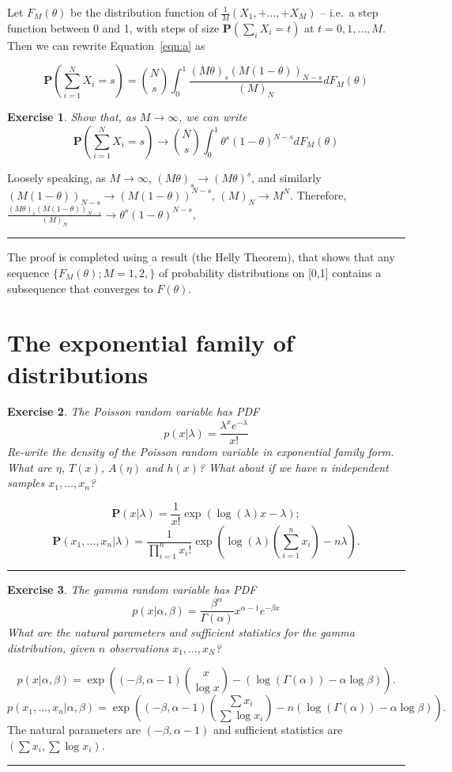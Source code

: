\documentclass[twoside]{article}
\newcounter{lecnum}
\newtheorem{exercise}{Exercise}[lecnum]
\newenvironment{proof}{{\bf Proof:}}{\hfill\rule{2mm}{2mm}}
\newcommand\Prob{\mathbf{P}}
\begin{document}
Let $F_M(\theta)$ be the distribution function of $\frac{1}{M}(X_1, + \dots, + X_M)$  --  i.e.\ a step function between 0 and 1, with steps of size $\Prob(\sum_i X_i= t)$ at $t=0,1,\dots, M$. Then we can rewrite Equation~\ref{eqn:a} as

$$\Prob\left(\sum_{i=1}^N X_i = s\right) = {N \choose s}\int_0^1\frac{(M\theta)_s(M(1-\theta))_{N-s}}{(M)_N}dF_M(\theta)$$
\begin{exercise}
  Show that, as $M\rightarrow \infty$, we can write
  $$\Prob\left(\sum_{i=1}^N X_i = s\right) \rightarrow {N \choose s}\int_0^1\theta^s(1-\theta)^{N-s}dF_M(\theta)$$
\end{exercise}

\begin{proof}
Loosely speaking, as $M \rightarrow \infty$, $(M\theta)_s \rightarrow (M\theta)^s$, and similarly $(M(1-\theta))_{N-s} \rightarrow (M(1-\theta))^{N-s}$, $(M)_N \rightarrow M^N$. Therefore, $\frac{(M\theta)_s(M(1-\theta))_{N-s}}{(M)_N} \rightarrow\theta^s(1-\theta)^{N-s},$
\end{proof}

The proof is completed using a result (the Helly Theorem), that shows that any sequence $\{F_M(\theta); M=1,2,\dot\}$ of probability distributions on [0,1] contains a subsequence that converges to $F(\theta)$.


\section{The exponential family of distributions}

\begin{exercise}
  The Poisson random variable has PDF
  $$p(x|\lambda) = \frac{\lambda^xe^{-\lambda}}{x!}$$
  Re-write the density of the Poisson random variable in exponential family form. What are $\eta$, $T(x)$, $A(\eta)$ and $h(x)$? What about if we have $n$ independent samples $x_1,\dots, x_n$?
\end{exercise}

\begin{proof}
$$\Prob(x|\lambda) = \frac {1}{x!}\exp (\log(\lambda)x - \lambda);$$
$$\Prob(x_1,..., x_n|\lambda) = \frac{1}{\prod_{i=1}^nx_i!}\exp(\log(\lambda)(\sum_{i=1}^nx_i)-n\lambda).$$
\end{proof}



\begin{exercise}
  The gamma random variable has PDF
  $$p(x|\alpha,\beta) = \frac{\beta^\alpha}{\Gamma(\alpha)}x^{\alpha-1}e^{-\beta x}$$
  What are the natural parameters and sufficient statistics for the gamma distribution, given $n$ observations $x_1,\dots, x_N$?
\end{exercise}
\begin{proof}
  $$p(x|\alpha,\beta) =\exp\left( (-\beta, \alpha-1){x \choose \log x} - (\log(\Gamma(\alpha))-\alpha \log\beta)\right).$$
  $$p(x_1, ..., x_n|\alpha,\beta) =\exp\left( (-\beta, \alpha-1){\sum x_i \choose \sum \log x_i} - n(\log(\Gamma(\alpha))-\alpha \log\beta)\right).$$
  The natural parameters are $(-\beta, \alpha-1)$ and sufficient statistics are $(\sum x_i, \sum \log x_i)$.
\end{proof}
\end{document}

